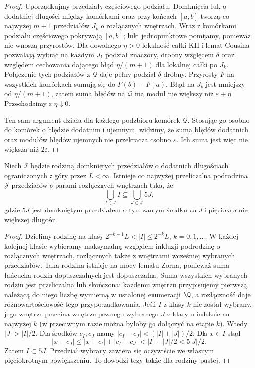 \begin{proof}
Uporządkujmy przedziały częściowego podziału. Domknięcia luk o dodatniej długości między komórkami oraz przy końcach $[a,b]$ tworzą co najwyżej $m+1$ przedziałów $J_k$ o rozłącznych wnętrzach. Wraz z komórkami podziału częściowego pokrywają $[a,b]$; luki jednopunktowe pomijamy, ponieważ nie wnoszą przyrostów. Dla dowolnego $\eta>0$ lokalność całki KH i lemat Cousina pozwalają wybrać na każdym $J_k$ podział znaczony, drobny względem $\delta$ oraz względem cechowania dającego błąd $\eta/(m+1)$ dla lokalnej całki po $J_k$. Połączenie tych podziałów z $\mathcal Q$ daje pełny podział $\delta$-drobny. Przyrosty $F$ na wszystkich komórkach sumują się do $F(b)-F(a)$. Błąd na $J_k$ jest mniejszy od $\eta/(m+1)$, zatem suma błędów na $\mathcal Q$ ma moduł nie większy niż $\varepsilon+\eta$. Przechodzimy z $\eta\downarrow0$.

Ten sam argument działa dla każdego podzbioru komórek $\mathcal Q$. Stosując go osobno do komórek o błędzie dodatnim i ujemnym, widzimy, że suma błędów dodatnich oraz modułów błędów ujemnych nie przekracza osobno $\varepsilon$. Ich suma jest więc nie większa niż $2\varepsilon$.
\end{proof}
\begin{lemat}\label{ma1:kh:lem:fivefold-cover}
Niech $\mathcal I$ będzie rodziną domkniętych przedziałów o dodatnich długościach ograniczonych z góry przez $L<\infty$. Istnieje co najwyżej przeliczalna podrodzina $\mathcal J$ przedziałów o parami rozłącznych wnętrzach taka, że
\[
 \bigcup_{I\in\mathcal I} I\subseteq\bigcup_{J\in\mathcal J}5J,
\]
gdzie $5J$ jest domkniętym przedziałem o tym samym środku co $J$ i pięciokrotnie większej długości.
\end{lemat}
\begin{proof}
Dzielimy rodzinę na klasy $2^{-k-1}L<|I|\le 2^{-k}L$, $k=0,1,\ldots$. W każdej kolejnej klasie wybieramy maksymalną względem inkluzji podrodzinę o rozłącznych wnętrzach, rozłącznych także z wnętrzami wcześniej wybranych przedziałów. Taka rodzina istnieje na mocy lematu Zorna, ponieważ suma łańcucha rodzin dopuszczalnych jest dopuszczalna. Suma wszystkich wybranych rodzin jest przeliczalna lub skończona: każdemu wnętrzu przypisujemy pierwszą należącą do niego liczbę wymierną w ustalonej enumeracji $\Q$, a rozłączność daje różnowartościowość tego przyporządkowania.
Jeśli $I$ z klasy $k$ nie został wybrany, jego wnętrze przecina wnętrze pewnego wybranego $J$ z klasy o indeksie co najwyżej $k$ (w przeciwnym razie można byłoby go dołączyć na etapie $k$). Wtedy $|J|>|I|/2$. Dla środków $c_I,c_J$ mamy $|c_I-c_J|<(|I|+|J|)/2$. Dla $x\in I$ stąd
\[
 |x-c_J|\le |x-c_I|+|c_I-c_J|<|I|+|J|/2<5|J|/2.
\]
Zatem $I\subset 5J$. Przedział wybrany zawiera się oczywiście we własnym pięciokrotnym powiększeniu. To dowodzi tezy także dla rodziny pustej.
\end{proof}

